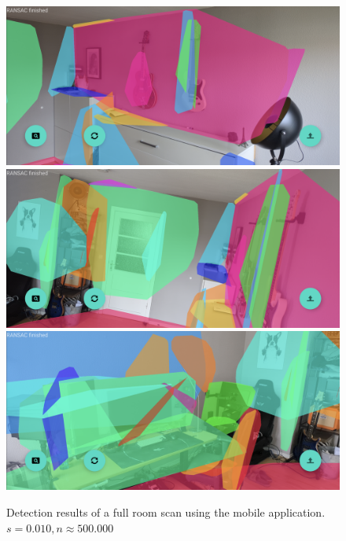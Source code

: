 \begin{figure}[h!tbp]
    \centering
    \includegraphics[width=0.9\linewidth]{images/full_room_3}
    \includegraphics[width=0.9\linewidth]{images/full_room_2}
    \includegraphics[width=0.9\linewidth]{images/full_room_1}
    \caption{Detection results of a full room scan using the mobile application. $s=0.010, n\approx500.000$}
    \label{fig:full-room-scan-results}
\end{figure}


